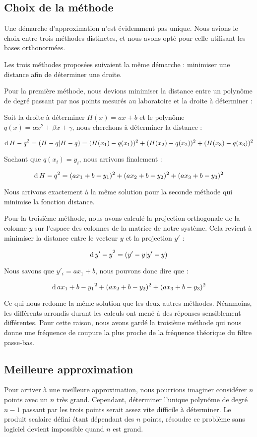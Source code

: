 \subsection{Choix de la méthode}

Une démarche d'approximation n'est évidemment pas unique. Nous avions le choix entre trois méthodes
distinctes, et nous avons opté pour celle utilisant les bases orthonormées.

Les trois méthodes proposées suivaient la même démarche : minimiser une distance afin de déterminer une droite. 

Pour la première méthode, nous devions minimiser la distance entre un polynôme de degré  passant par nos
points mesurés au laboratoire et la droite à déterminer :

Soit la droite à déterminer $H(x) = ax + b$ et le polynôme $q(x) = \alpha x^2 + \beta x + \gamma$, nous
cherchons à déterminer la distance :

$$\operatorname{d}{H-q}^2 = (H-q|H-q) = (H(x_1)-q(x_1))^2 + (H(x_2)-q(x_2))^2 + (H(x_3)-q(x_3))^2$$

Sachant que $q(x_i) = y_i$, nous arrivons finalement :

$$\operatorname{d}{H-q}^2 = (ax_1 + b - y_1)^2 + (ax_2 + b - y_2)^2 + (ax_3 + b - y_3)^2$$

Nous arrivons exactement à la même solution pour la seconde méthode qui minimise la fonction distance. 

Pour la troisième méthode, nous avons calculé la projection orthogonale de la colonne $y$ sur l'espace
des colonnes de la matrice de notre système. Cela revient à minimiser la distance entre le vecteur $y$ 
et la projection $y'$ :

$$\operatorname{d}{y'-y}^2 = (y'-y|y'-y)$$

Nous savons que $y'_i = ax_1 + b$, nous pouvons donc dire que :

$$\operatorname{d}{ax_1 + b - y_1}^2 + (ax_2 + b - y_2)^2 + (ax_3 + b - y_3)^2$$

Ce qui nous redonne la même solution que les deux autres méthodes. 
Néanmoins, les différents arrondis durant les calculs ont mené à des réponses sensiblement différentes. 
Pour cette raison, nous avons gardé la troisième méthode qui nous donne une fréquence de coupure la plus
proche de la fréquence théorique du filtre passe-bas.
 
\subsection{Meilleure approximation}
Pour arriver à une meilleure approximation, nous pourrions imaginer considérer $n$ points avec un
$n$ très grand. Cependant, déterminer l'unique polynôme de degré $n-1$ passant par les trois points 
serait assez vite difficile à déterminer. Le produit scalaire défini étant dépendant 
des $n$ points, résoudre ce problème sans logiciel devient impossible quand $n$ est grand.  

